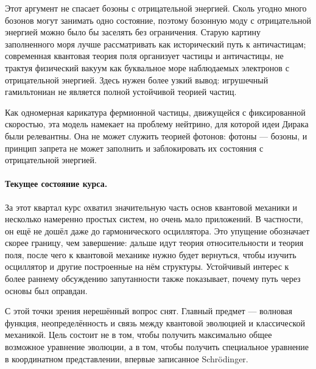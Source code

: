 Этот аргумент не спасает бозоны с отрицательной энергией. Сколь угодно много бозонов могут занимать одно состояние, поэтому бозонную моду с отрицательной энергией можно было бы заселять без ограничения. Старую картину заполненного моря лучше рассматривать как исторический путь к античастицам; современная квантовая теория поля организует частицы и античастицы, не трактуя физический вакуум как буквальное море наблюдаемых электронов с отрицательной энергией. Здесь нужен более узкий вывод: игрушечный гамильтониан не является полной устойчивой теорией частиц.

Как одномерная карикатура фермионной частицы, движущейся с фиксированной скоростью, эта модель намекает на проблему нейтрино, для которой идеи Дирака были релевантны. Она не может служить теорией фотонов: фотоны — бозоны, и принцип запрета не может заполнить и заблокировать их состояния с отрицательной энергией.

\begin{classroomqa}
\end{classroomqa}

\paragraph{Текущее состояние курса.}
За этот квартал курс охватил значительную часть основ квантовой механики и несколько намеренно простых систем, но очень мало приложений. В частности, он ещё не дошёл даже до гармонического осциллятора. Это упущение обозначает скорее границу, чем завершение: дальше идут теория относительности и теория поля, после чего к квантовой механике нужно будет вернуться, чтобы изучить осциллятор и другие построенные на нём структуры. Устойчивый интерес к более раннему обсуждению запутанности также показывает, почему путь через основы был оправдан.

С этой точки зрения нерешённый вопрос снят. Главный предмет — волновая функция, неопределённость и связь между квантовой эволюцией и классической механикой. Цель состоит не в том, чтобы получить максимально общее возможное уравнение эволюции, а в том, чтобы получить специальное уравнение в координатном представлении, впервые записанное Schr\"odinger.

